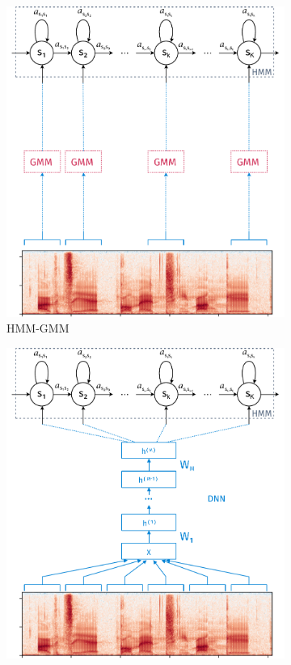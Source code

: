 \begin{figure}[htpb]
  \centering
  \begin{subfigure}[b]{0.4\textwidth}
    \includegraphics[width=\textwidth]{./ch5-construction/img/HMM-GMM.pdf}
    \caption{HMM-GMM}
    \label{fig:experiments:normalization:hmm:gmm}
  \end{subfigure}
  \begin{subfigure}[b]{0.4\textwidth}
    \includegraphics[width=\textwidth]{./ch5-construction/img/HMM-DNN.pdf}

\end{subfigure}
\end{figure}
